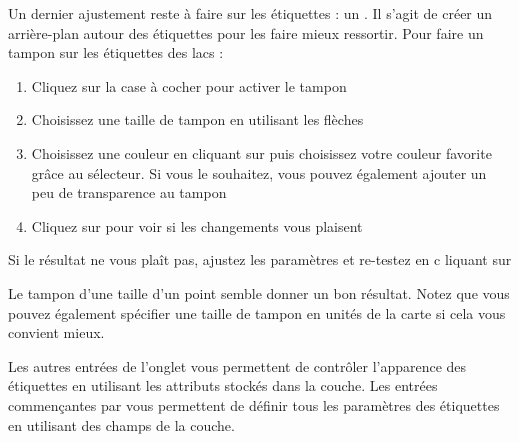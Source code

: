 Un dernier ajustement reste à faire sur les étiquettes : un . Il 
s'agit de créer un arrière-plan autour des étiquettes pour les faire mieux ressortir. 
Pour faire un tampon sur les étiquettes des lacs :

\begin{enumerate}
\item Cliquez sur la case à cocher  pour activer 
le tampon
\item Choisissez une taille de tampon en utilisant les flèches
\item Choisissez une couleur en cliquant sur  puis choisissez 
votre couleur favorite grâce au sélecteur. Si vous le souhaitez, vous pouvez 
également ajouter un peu de transparence au tampon
\item Cliquez sur  pour voir si les changements vous plaisent
\end{enumerate}

Si le résultat ne vous plaît pas, ajustez les paramètres et re-testez en c
liquant sur 

Le tampon d'une taille d'un point semble donner un bon résultat. Notez que vous 
pouvez également spécifier une taille de tampon en unités de la carte si cela 
vous convient mieux.

Les autres entrées de l'onglet  vous permettent de contrôler 
l'apparence des étiquettes en utilisant les attributs stockés dans la couche. 
Les entrées commençantes par  vous permettent de définir tous 
les paramètres des étiquettes en utilisant des champs de la couche.

